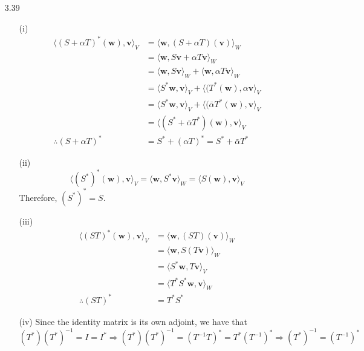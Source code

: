 \documentclass[letterpaper,12pt]{article}
\theoremstyle{definition}
\begin{document}
\begin{enumerate}
        \item[3.39]
          \begin{enumerate}
            \item[(i)]
            \begin{align*}
              \langle (S+\alpha T)^*(\mathbf{w}), \mathbf{v} \rangle_V &= \langle \mathbf{w}, (S+\alpha T)(\mathbf{v})\rangle_W \\
              &= \langle \mathbf{w}, S\mathbf{v}+\alpha T\mathbf{v}\rangle_W \\
              &=  \langle \mathbf{w}, S\mathbf{v} \rangle_W + \langle \mathbf{w}, \alpha T\mathbf{v}\rangle_W \\
              &= \langle S^*\mathbf{w}, \mathbf{v} \rangle_V + \langle ( T^*(\mathbf{w}), \alpha\mathbf{v}\rangle_V \\
              &= \langle S^*\mathbf{w}, \mathbf{v} \rangle_V + \langle ( \bar{\alpha}T^*(\mathbf{w}), \mathbf{v}\rangle_V \\
              &= \langle (S^* + \bar{\alpha}T^*)(\mathbf{w}),\mathbf{v} \rangle_V \\
              \therefore (S+\alpha T)^* &= S^* + (\alpha T)^* = S^* + \bar{\alpha}T^*
            \end{align*}
            \item[(ii)]
              \begin{equation*}
                \langle (S^*)^*(\mathbf{w}), \mathbf{v} \rangle_V =  \langle \mathbf{w}, S^*\mathbf{v}\rangle_W  = \langle S(\mathbf{w}), \mathbf{v} \rangle_V
              \end{equation*}
              Therefore, $(S^*)^* = S$.
            \item[(iii)]
              \begin{align*}
                \langle (ST)^*(\mathbf{w}), \mathbf{v} \rangle_V &= \langle \mathbf{w}, (ST)(\mathbf{v})\rangle_W \\
                &= \langle \mathbf{w}, S(T\mathbf{v})\rangle_W \\
                &= \langle S^*\mathbf{w}, T\mathbf{v}\rangle_V \\
                &= \langle T^*S^*\mathbf{w}, \mathbf{v}\rangle_W \\
                \therefore (ST)^* &= T^*S^*
              \end{align*}
            \item[(iv)]
              Since the identity matrix is its own adjoint, we have that
              \begin{equation*}
                (T^*)(T^*)^{-1} = I = I^* \Longrightarrow (T^*)(T^*)^{-1} = (T^{-1}T)^* = T^*(T^{-1})^* \Longrightarrow (T^*)^{-1} = (T^{-1})^*
              \end{equation*}
          \end{enumerate}


\end{enumerate}
\end{document}
